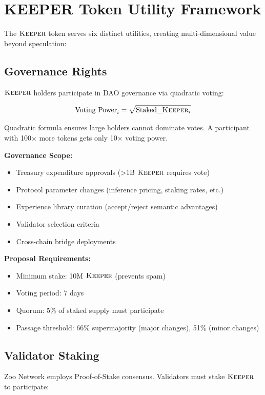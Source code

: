 \section{KEEPER Token Utility Framework}


The $\textsc{Keeper}$ token serves six distinct utilities, creating multi-dimensional value beyond speculation:

\subsection{Governance Rights}

$\textsc{Keeper}$ holders participate in DAO governance via quadratic voting:

\begin{equation}
\text{Voting Power}_i = \sqrt{\text{Staked}\_\textsc{Keeper}_i}
\end{equation}

Quadratic formula ensures large holders cannot dominate votes. A participant with 100× more tokens gets only 10× voting power.

\textbf{Governance Scope:}
\begin{itemize}
\item Treasury expenditure approvals (>1B $\textsc{Keeper}$ requires vote)
\item Protocol parameter changes (inference pricing, staking rates, etc.)
\item Experience library curation (accept/reject semantic advantages)
\item Validator selection criteria
\item Cross-chain bridge deployments
\end{itemize}

\textbf{Proposal Requirements:}
\begin{itemize}
\item Minimum stake: 10M $\textsc{Keeper}$ (prevents spam)
\item Voting period: 7 days
\item Quorum: 5\% of staked supply must participate
\item Passage threshold: 66\% supermajority (major changes), 51\% (minor changes)
\end{itemize}

\subsection{Validator Staking}

Zoo Network employs Proof-of-Stake consensus. Validators must stake $\textsc{Keeper}$ to participate:

